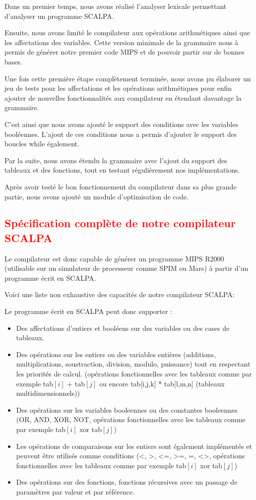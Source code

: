 \documentclass[a4paper]{article}
\newcommand{\csection}[1]{\textcolor{red}{\section{#1}}}
\begin{document}
Dans un premier temps, nous avons réalisé l'analyser lexicale permettant d'analyser un programme SCALPA.

Ensuite, nous avons limité le compilateur aux opérations arithmétiques ainsi que les affectations des variables. Cette version minimale de la grammaire nous à permis de générer notre premier code MIPS et de pouvoir partir sur de bonnes bases.

Une fois cette première étape complètement terminée, nous avons pu élaborer un jeu de tests pour les affectations et les opérations arithmétiques pour enfin ajouter de nouvelles fonctionnalités aux compilateur en étendant davantage la grammaire.

C'est ainsi que nous avons ajouté le support des conditions avec les variables booléennes. L'ajout de ces conditions nous a permis d'ajouter le support des boucles while également.

Par la suite, nous avons étendu la grammaire avec l'ajout du support des tableaux et des fonctions, tout en testant régulièrement nos implémentations.

Après avoir testé le bon fonctionnement du compilateur dans sa plus grande partie, nous avons ajouté un module d'optimisation de code.

\csection{Spécification complète de notre compilateur SCALPA}

Le compilateur est donc capable de générer un programme MIPS R2000 (utilisable sur un simulateur de processeur comme SPIM ou Mars) à partir d'un programme écrit en SCALPA.

Voici une liste non exhaustive des capacités de notre compilateur SCALPA:

Le programme écrit en SCALPA peut donc supporter :
\begin{itemize}
    \item Des affectations d'entiers et booléens sur des variables ou des cases de tableaux.
    \item Des opérations sur les entiers ou des variables entières (additions, multiplications, soustraction, division, modulo, puissance) tout en respectant les priorités de calcul. (opérations fonctionnelles avec les tableaux comme par exemple tab$[i]$ + tab$[j]$ ou encore tab[i,j,k] * tab[l,m,n] (tableaux multidimensionnels))
    \item Des opérations sur les variables booleennes ou des constantes booleennes (OR, AND, XOR, NOT, opérations fonctionnelles avec les tableaux comme par exemple tab$[i]$ xor tab$[j]$)
    \item Les opérations de comparaisons sur les entiers sont également implémentés et peuvent être utilisés comme conditions (<, >, <=, >=, =, <>, opérations fonctionnelles avec les tableaux comme par exemple tab$[i]$ xor tab$[j]$)
    \item Des opérations sur des fonctions, fonctions récursives avec un passage de paramètres par valeur et par référence.

\end{itemize}
\end{document}
